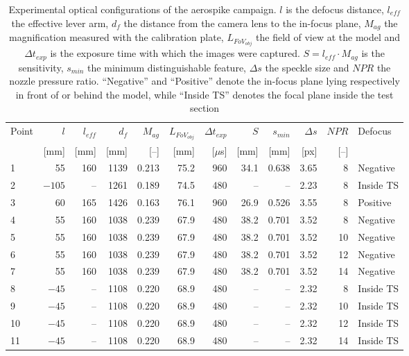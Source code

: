 \begin{table}[htbp]
    \centering
    \caption[Optical configurations measured on site for the aerospike campaign]{Experimental optical configurations of the aerospike campaign. $l$ is the defocus distance, $l_{eff}$ the effective lever arm, $d_f$ the distance from the camera lens to the in-focus plane, $M_{ag}$ the magnification measured with the calibration plate, $L_{FoV_{obj}}$ the field of view at the model and $\Delta t_{exp}$ is the exposure time with which the images were captured. $S = l_{eff} \cdot M_{ag}$ is the sensitivity, $s_{min}$ the minimum distinguishable feature, $\Delta s$ the speckle size and $NPR$ the nozzle pressure ratio. ``Negative'' and ``Positive'' denote the in-focus plane lying respectively in front of or behind the model, while ``Inside TS'' denotes the focal plane inside the test section}
    \label{tab: aerospike experimental results}
    \small
    \begin{tabular}{lrrrrrrrrrrl}
        \toprule
        Point & $l$ & $l_{eff}$ & $d_f$ & $M_{ag}$ & $L_{FoV_{obj}}$ & $\Delta t_{exp}$& $S$ & $s_{min}$ & $\Delta s$ & $NPR$ & Defocus \\
              & [mm] & [mm] & [mm] & [--] & [mm] & [$\mu$s] & [mm] & [mm] & [px] & [--] & \\
        \midrule
         1 &  55 & 160 & 1139 & 0.213 & 75.2 & 960 & 34.1 & 0.638 & 3.65 &  8 & Negative \\
         2 & $-105$ &  -- & 1261 & 0.189 & 74.5 & 480 &  -- & -- & 2.23 &  8 & Inside TS \\
         3 &  60 & 165 & 1426 & 0.163 & 76.1 & 960 & 26.9 & 0.526 & 3.55 &  8 & Positive \\
        \midrule
         4 &  55 & 160 & 1038 & 0.239 & 67.9 & 480 & 38.2 & 0.701 & 3.52 &  8 & Negative \\
         5 &  55 & 160 & 1038 & 0.239 & 67.9 & 480 & 38.2 & 0.701 & 3.52 & 10 & Negative \\
         6 &  55 & 160 & 1038 & 0.239 & 67.9 & 480 & 38.2 & 0.701 & 3.52 & 12 & Negative \\
         7 &  55 & 160 & 1038 & 0.239 & 67.9 & 480 & 38.2 & 0.701 & 3.52 & 14 & Negative \\
         8 & $-45$ & -- & 1108 & 0.220 & 68.9 & 480 & -- & -- & 2.32 &  8 & Inside TS \\
         9 & $-45$ & -- & 1108 & 0.220 & 68.9 & 480 & -- & -- & 2.32 & 10 & Inside TS \\
        10 & $-45$ & -- & 1108 & 0.220 & 68.9 & 480 & -- & -- & 2.32 & 12 & Inside TS \\
        11 & $-45$ & -- & 1108 & 0.220 & 68.9 & 480 & -- & -- & 2.32 & 14 & Inside TS \\
        \bottomrule
    \end{tabular}
\end{table}


